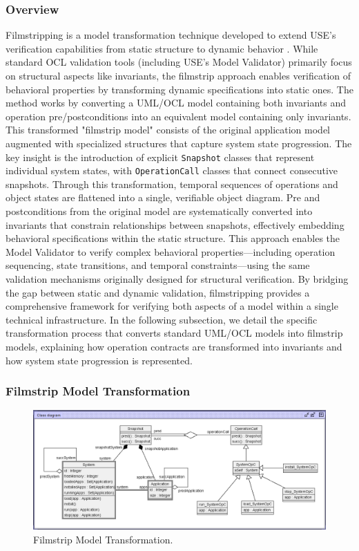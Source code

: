 \subsubsection{Overview}
Filmstripping is a model transformation technique developed to extend USE's 
verification capabilities from static structure to dynamic behavior \cite{Filmstripping}. 
While standard OCL validation tools (including USE's Model Validator) primarily 
focus on structural aspects like invariants, the filmstrip approach enables 
verification of behavioral properties by transforming dynamic specifications into 
static ones. The method works by converting a UML/OCL model containing both invariants 
and operation pre/postconditions into an equivalent model containing only invariants. 
This transformed "filmstrip model" consists of the original application model 
augmented with specialized structures that capture system state progression. The 
key insight is the introduction of explicit \texttt{Snapshot} classes that represent 
individual system states, with \texttt{OperationCall} classes that connect 
consecutive snapshots. Through this transformation, temporal sequences of operations 
and object states are flattened into a single, verifiable object diagram. Pre and 
postconditions from the original model are systematically converted into invariants 
that constrain relationships between snapshots, effectively embedding behavioral 
specifications within the static structure. This approach enables the Model Validator 
to verify complex behavioral properties—including operation sequencing, state 
transitions, and temporal constraints—using the same validation mechanisms originally 
designed for structural verification. By bridging the gap between static and dynamic 
validation, filmstripping provides a comprehensive framework for verifying both 
aspects of a model within a single technical infrastructure. In the following 
subsection, we detail the specific transformation process that converts standard 
UML/OCL models into filmstrip models, explaining how operation contracts are 
transformed into invariants and how system state progression is represented.

\subsubsection{Filmstrip Model Transformation}

\begin{figure}
    \centering
    \includegraphics[width=1\textwidth]{figures/c1/SoftwareSystem/SS_Filmstrip_Gray_Edited.png}
    \caption{Filmstrip Model Transformation.}
    \label{fig:filmstrip_model}
\end{figure}

